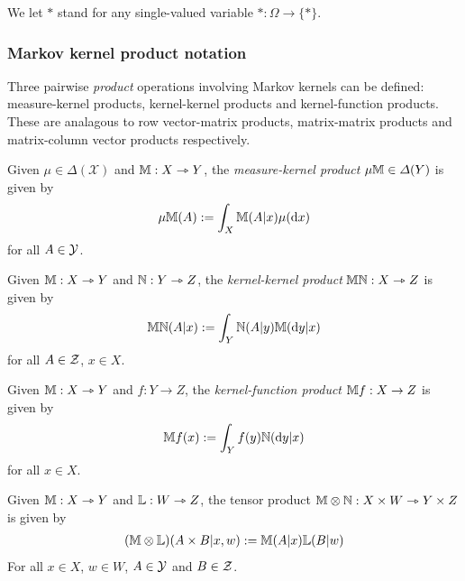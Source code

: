 \begin{definition}\label{no:single_valued}
We let $*$ stand for any single-valued variable $*:\Omega\to \{*\}$.
\end{definition}

\subsubsection{Markov kernel product notation}\label{ssec:product_notation}

Three pairwise \emph{product} operations involving Markov kernels can be defined: measure-kernel products, kernel-kernel products and kernel-function products. These are analagous to row vector-matrix products, matrix-matrix products and matrix-column vector products respectively.

\begin{definition}
Given $\mu\in \Delta(\mathcal{X})$ and $\mathbb{M}:X\rightarrowtriangle Y$, the \emph{measure-kernel product} $\mu\mathbb{M}\in \Delta(Y)$ is given by
\begin{align}
\mu\mathbb{M} (A) := \int_X \mathbb{M}(A|x) \mu(\mathrm{d}x)
\end{align}
for all $A\in \mathcal{Y}$.
\end{definition}

\begin{definition}\label{def:kproduct}
Given $\mathbb{M}:X\rightarrowtriangle Y$ and $\mathbb{N}:Y\rightarrowtriangle Z$, the \emph{kernel-kernel product} $\mathbb{M}\mathbb{N}:X\rightarrowtriangle Z$ is given by
\begin{align}
\mathbb{MN} (A|x) := \int_Y \mathbb{N}(A|y) \mathbb{M}(\mathrm{d}y|x)
\end{align}
for all $A\in \mathcal{Z}$, $x\in X$.
\end{definition}

\begin{definition}
Given $\mathbb{M}:X\rightarrowtriangle Y$ and $f:Y\to Z$, the \emph{kernel-function product} $\mathbb{M}f:X\to Z$ is given by
\begin{align}
\mathbb{M}f (x) := \int_Y f(y)\mathbb{N}(\mathrm{d}y|x)
\end{align}
for all $x\in X$.
\end{definition}

\begin{definition}
Given $\mathbb{M}:X\rightarrowtriangle Y$ and $\mathbb{L}:W\rightarrowtriangle Z$, the tensor product $\mathbb{M}\otimes\mathbb{N}:X\times W\rightarrowtriangle Y\times Z$ is given by
\begin{align}
	(\mathbb{M}\otimes\mathbb{L})(A\times B|x,w):=\mathbb{M}(A|x)\mathbb{L}(B|w)
\end{align}
For all $x\in X$, $w\in W$, $A\in \mathcal{Y}$ and $B\in \mathcal{Z}$.
\end{definition}

